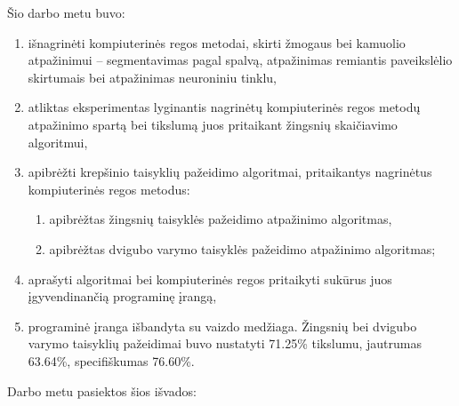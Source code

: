 \documentclass{VUMIFPSbakalaurinis}
\begin{document}
{

Šio darbo metu buvo:

\begin{enumerate}
	\item išnagrinėti kompiuterinės regos metodai, skirti žmogaus bei kamuolio atpažinimui – segmentavimas pagal spalvą, atpažinimas remiantis paveikslėlio skirtumais bei atpažinimas neuroniniu tinklu,
	\item atliktas eksperimentas lyginantis nagrinėtų kompiuterinės regos metodų atpažinimo spartą bei tikslumą juos pritaikant žingsnių skaičiavimo algoritmui, 
	\item apibrėžti krepšinio taisyklių pažeidimo algoritmai, pritaikantys nagrinėtus kompiuterinės regos metodus:
	\begin{enumerate}
		\item apibrėžtas žingsnių taisyklės pažeidimo atpažinimo algoritmas,
		\item apibrėžtas dvigubo varymo taisyklės pažeidimo atpažinimo algoritmas;
	\end{enumerate}
	\item aprašyti algoritmai bei kompiuterinės regos pritaikyti sukūrus juos įgyvendinančią programinę įrangą,
	\item programinė įranga išbandyta su vaizdo medžiaga. Žingsnių bei dvigubo varymo taisyklių pažeidimai buvo nustatyti 71.25\% tikslumu, jautrumas 63.64\%, specifiškumas 76.60\%.
\end{enumerate}


Darbo metu pasiektos šios išvados:

}
\end{document}
